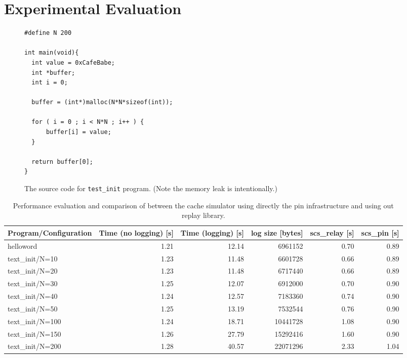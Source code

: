 \section{Experimental Evaluation}

\begin{figure}
  \lstset{language=C, basicstyle=\small}
  \begin{lstlisting}
#define N 200

int main(void){
  int value = 0xCafeBabe;
  int *buffer;
  int i = 0;

  buffer = (int*)malloc(N*N*sizeof(int));

  for ( i = 0 ; i < N*N ; i++ ) {
      buffer[i] = value;
  }

  return buffer[0];
}
  \end{lstlisting}
  \caption{The source code for \texttt{test\_init} program. (Note the memory leak is intentionally.)}
  \label{fig:text_init}
\end{figure}

\begin{table}
  \begin{tabularx}{\textwidth}{X r r r r r}
    \toprule
    Program/Configuration & Time (no logging) [s] & Time (logging) [s] & log size [bytes] & scs\_relay [s] & scs\_pin [s]\\
    \midrule
    helloword         & 1.21 & 12.14 &  6961152 & 0.70  & 0.89 \\
    \addlinespace[1mm]
    \rowcolor[gray]{.9}
    text\_init/N=10   & 1.23 & 11.48 &  6601728 & 0.66 & 0.89 \\
    \addlinespace[1mm]
    text\_init/N=20   & 1.23 & 11.48 &  6717440 & 0.66 & 0.89 \\ 
    \addlinespace[1mm]
    \rowcolor[gray]{.9}
    text\_init/N=30   & 1.25 & 12.07 &  6912000 & 0.70 & 0.90 \\
    \addlinespace[1mm]
    text\_init/N=40   & 1.24 & 12.57 &  7183360 & 0.74 & 0.90 \\
    \addlinespace[1mm]
    \rowcolor[gray]{.9}
    text\_init/N=50   & 1.25 & 13.19 &  7532544 & 0.76 & 0.90 \\
    \addlinespace[1mm]
    text\_init/N=100  & 1.24 & 18.71 & 10441728 & 1.08 & 0.90 \\
    \addlinespace[1mm]
    \rowcolor[gray]{.9}
    text\_init/N=150  & 1.26 & 27.79 & 15292416 & 1.60 & 0.90 \\
    \addlinespace[1mm]
    text\_init/N=200  & 1.28 & 40.57 & 22071296 & 2.33 & 1.04 \\
    \bottomrule
  \end{tabularx}
  \caption{Performance evaluation and comparison of between the cache
    simulator using directly the pin infrastructure and using out
    replay library.}
\end{table}

